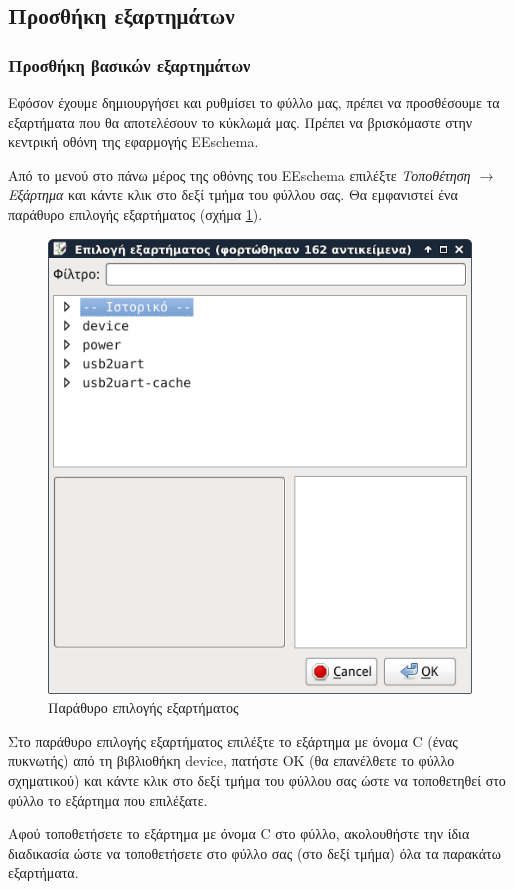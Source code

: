 \documentclass[a4paper]{article}
\begin{document}
\subsection{Προσθήκη εξαρτημάτων}

\subsubsection{Προσθήκη βασικών εξαρτημάτων}

Εφόσον έχουμε δημιουργήσει και ρυθμίσει το φύλλο μας, πρέπει να προσθέσουμε τα εξαρτήματα που θα αποτελέσουν το κύκλωμά μας. Πρέπει να βρισκόμαστε στην κεντρική οθόνη της εφαρμογής \textenglish{EEschema}.

Από το μενού στο πάνω μέρος της οθόνης του \textenglish{EEschema} επιλέξτε \textit{Τοποθέτηση $\rightarrow$ Εξάρτημα} και κάντε κλικ στο δεξί τμήμα του φύλλου σας. Θα εμφανιστεί ένα παράθυρο επιλογής εξαρτήματος (σχήμα \ref{fig:eesch-dial-addcomp}).

\begin{figure}
  \begin{center}
    \includegraphics[width=.5\textwidth]{img/eesch-dial-addcomp.png}
    \caption{Παράθυρο επιλογής εξαρτήματος}
    \label{fig:eesch-dial-addcomp}
  \end{center}
\end{figure}

Στο παράθυρο επιλογής εξαρτήματος επιλέξτε το εξάρτημα με όνομα C (ένας πυκνωτής) από τη βιβλιοθήκη device, πατήστε ΟΚ (θα επανέλθετε το φύλλο σχηματικού) και κάντε κλικ στο δεξί τμήμα του φύλλου σας ώστε να τοποθετηθεί στο φύλλο το εξάρτημα που επιλέξατε. 

Αφού τοποθετήσετε το εξάρτημα με όνομα C στο φύλλο, ακολουθήστε την ίδια διαδικασία ώστε να τοποθετήσετε στο φύλλο σας (στο δεξί τμήμα) όλα τα παρακάτω εξαρτήματα. 
\end{document}
